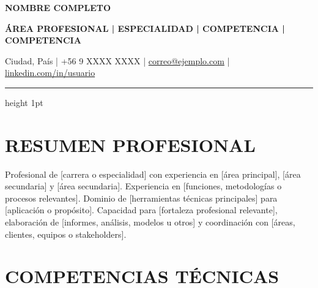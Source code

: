 \documentclass[10pt,a4paper]{article}
\begin{document}
\fontsize{9.2}{11}\selectfont
\color{texto}

\begin{center}
    {\fontsize{23}{27}\selectfont
     \bfseries\color{principal}NOMBRE COMPLETO\par}

    \vspace{4pt}

    {\fontsize{9.5}{12}\selectfont
     \bfseries
     ÁREA PROFESIONAL | ESPECIALIDAD | COMPETENCIA | COMPETENCIA
     \par}

    \vspace{5pt}

    {\fontsize{8.5}{10.5}\selectfont\color{secundario}
     Ciudad, País \quad | \quad +56 9 XXXX XXXX \quad | \quad
     \href{mailto:correo@ejemplo.com}{correo@ejemplo.com}
     \quad | \quad
     \href{https://linkedin.com/in/usuario}{linkedin.com/in/usuario}
     \par}
\end{center}

\vspace{-3pt}
{\color{principal}\hrule height 1pt}
\vspace{2pt}

\section{RESUMEN PROFESIONAL}

Profesional de [carrera o especialidad] con experiencia en
[área principal], [área secundaria] y [área secundaria].
Experiencia en [funciones, metodologías o procesos relevantes].
Dominio de [herramientas técnicas principales] para
[aplicación o propósito]. Capacidad para
[fortaleza profesional relevante], elaboración de
[informes, análisis, modelos u otros] y coordinación con
[áreas, clientes, equipos o stakeholders].

\section{COMPETENCIAS TÉCNICAS}
\end{document}
